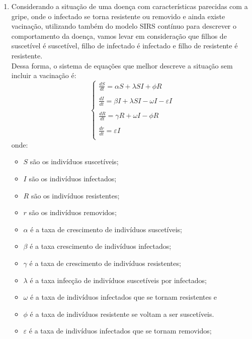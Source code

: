 \documentclass[a4paper]{article}
\begin{document}
\begin{enumerate}
\item
Considerando a situa\c{c}\~ao de uma doen\c{c}a com caracter\'isticas parecidas com a gripe, onde o infectado se torna resistente ou removido e ainda existe vacina\c{c}\~ao, utilizando tamb\'em do modelo SIRS cont\'inuo para descrever o comportamento da doen\c{c}a, vamos levar em considera\c{c}\~ao que filhos de suscet\'ivel \'e suscet\'ivel, filho de infectado \'e infectado e filho de resistente \'e resistente. 
\\
Dessa forma, o sistema de equa\c{c}\~oes que melhor descreve a situa\c{c}\~ao sem incluir a vacina\c{c}\~ao \'e:
\\
\begin{equation}
\left\{\begin{array}{l}
\frac{dS}{dt} = \alpha S + \lambda SI + \phi R\\
\\
\frac{dI}{dt} = \beta I + \lambda SI - \omega I - \varepsilon I\\
\\
\frac{dR}{dt} = \gamma R + \omega I - \phi R \\
\\
\frac{dr}{dt} = \varepsilon I \\
\end{array}
\end{equation}
onde:
\begin{itemize}
\item$S$ s\~ao os indiv\'iduos suscet\'iveis;
\item$I$ s\~ao os indiv\'iduos infectados;
\item$R$ s\~ao os indiv\'iduos resistentes;
\item$r$ s\~ao os indiv\'iduos removidos;
\item$\alpha$ \'e a taxa de crescimento de indiv\'iduos suscet\'iveis;
\item$\beta$ \'e a taxa crescimento de indiv\'iduos infectados;
\item$\gamma$ \'e a taxa de crescimento de indiv\'iduos resistentes;
\item$\lambda$ \'e a taxa infec\c{c}\~ao de indiv\'iduos suscet\'iveis por infectados;
\item$\omega$ \'e a taxa de indiv\'iduos infectados que se tornam resistentes e
\item$\phi$ \'e a taxa de indiv\'iduos resistente se voltam a ser suscet\'iveis.
\item$\varepsilon$ \'e a taxa de indiv\'iduos infectados que se tornam removidos;

\end{itemize}
\end{enumerate}
\end{document}
